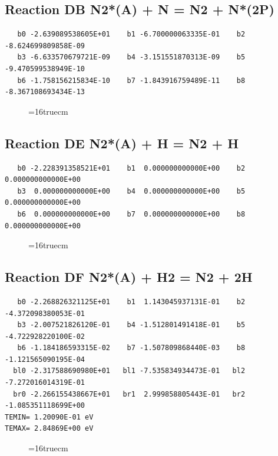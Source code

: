 \documentclass[12pt,dvipdfm]{article}
\begin{document}
\subsection{
Reaction DB N2*(A) + N  = N2 + N*(2P)}
\begin{small}\begin{verbatim}
   b0 -2.639089538605E+01    b1 -6.700000063335E-01    b2 -8.624699809858E-09
   b3 -6.633570679721E-09    b4 -3.151551870313E-09    b5 -9.470599538949E-10
   b6 -1.758156215834E-10    b7 -1.843916759489E-11    b8 -8.367108693434E-13
   \end{verbatim}\end{small}
\begin{figure}[h!]
\label{n2rates}
\epsfxsize=16truecm
\end{figure}
\newpage

\subsection{
Reaction DE N2*(A) + H = N2 + H}
\begin{small}\begin{verbatim}
   b0 -2.228391358521E+01    b1  0.000000000000E+00    b2  0.000000000000E+00
   b3  0.000000000000E+00    b4  0.000000000000E+00    b5  0.000000000000E+00
   b6  0.000000000000E+00    b7  0.000000000000E+00    b8  0.000000000000E+00
   \end{verbatim}\end{small}
\begin{figure}[h!]
\label{n2rates}
\epsfxsize=16truecm
\end{figure}
\newpage

\subsection{
Reaction DF N2*(A) + H2  = N2 + 2H}
\begin{small}\begin{verbatim}
   b0 -2.268826321125E+01    b1  1.143045937131E-01    b2 -4.372098380053E-01
   b3 -2.007521826120E-01    b4 -1.512801491418E-01    b5 -4.722928220100E-02
   b6 -1.184186593315E-02    b7 -1.507809868440E-03    b8 -1.121565090195E-04
  bl0 -2.317588690980E+01   bl1 -7.535834934473E-01   bl2 -7.272016014319E-01
  br0 -2.266155438667E+01   br1  2.999858805443E-01   br2 -1.085351118699E+00
TEMIN= 1.20090E-01 eV
TEMAX= 2.84869E+00 eV
   \end{verbatim}\end{small}
\begin{figure}[h!]
\label{n2rates}
\epsfxsize=16truecm
\end{figure}
\newpage
\end{document}
